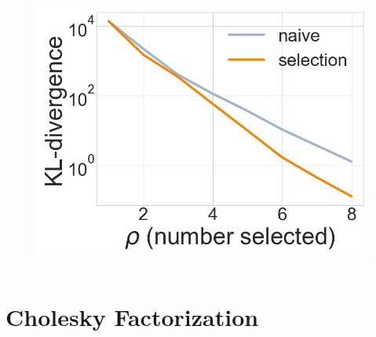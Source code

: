 \documentclass{beamer}                             %
\begin{document}
\begin{frame}
\begin{columns}
\begin{column}{0.4\textwidth}
    \begin{figure}[h!]
      \centering
      \includegraphics[width=\textwidth]{data/rho_kl-div}
    \end{figure}
  \end{column}
\end{columns}

{\let\thefootnote\relax\footnotetext{~ \newline ~}}
\end{frame}
\endgroup

\section{Cholesky Factorization}
\end{document}

